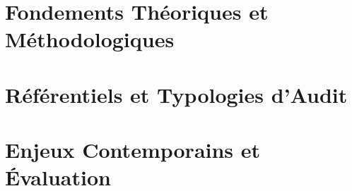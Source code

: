 \documentclass[12pt, a4paper, twoside, openright]{book}
\begin{document}
\mainmatter



\part{Fondements Théoriques et Méthodologiques}







\part{Référentiels et Typologies d'Audit}





\part{Enjeux Contemporains et Évaluation}





\end{document}
